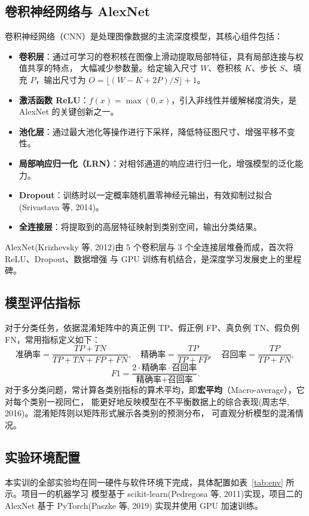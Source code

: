 \documentclass[12pt,a4paper,fontset=fandol]{ctexart}   %
\numberwithin{figure}{section}
\numberwithin{table}{section}
\numberwithin{equation}{section}
\begin{document}
\subsection{卷积神经网络与 AlexNet}
卷积神经网络（CNN）是处理图像数据的主流深度模型，其核心组件包括：
\begin{itemize}[leftmargin=2.2em]
  \item \textbf{卷积层}：通过可学习的卷积核在图像上滑动提取局部特征，具有局部连接与权值共享的特点，
  大幅减少参数量。给定输入尺寸 $W$、卷积核 $K$、步长 $S$、填充 $P$，输出尺寸为
  $O=\lfloor (W-K+2P)/S\rfloor+1$。
  \item \textbf{激活函数 ReLU}：$f(x)=\max(0,x)$，引入非线性并缓解梯度消失，是 AlexNet 的关键创新之一。
  \item \textbf{池化层}：通过最大池化等操作进行下采样，降低特征图尺寸、增强平移不变性。
  \item \textbf{局部响应归一化（LRN）}：对相邻通道的响应进行归一化，增强模型的泛化能力。
  \item \textbf{Dropout}：训练时以一定概率随机置零神经元输出，有效抑制过拟合(Srivastava 等, 2014)。
  \item \textbf{全连接层}：将提取到的高层特征映射到类别空间，输出分类结果。
\end{itemize}
AlexNet(Krizhevsky 等, 2012)由 5 个卷积层与 3 个全连接层堆叠而成，首次将 ReLU、Dropout、数据增强
与 GPU 训练有机结合，是深度学习发展史上的里程碑。

\subsection{模型评估指标}
对于分类任务，依据混淆矩阵中的真正例 TP、假正例 FP、真负例 TN、假负例 FN，常用指标定义如下：
\begin{equation}
\text{准确率}=\frac{TP+TN}{TP+TN+FP+FN},\quad
\text{精确率}=\frac{TP}{TP+FP},\quad
\text{召回率}=\frac{TP}{TP+FN},
\end{equation}
\begin{equation}
F1=\frac{2\cdot\text{精确率}\cdot\text{召回率}}{\text{精确率}+\text{召回率}}.
\end{equation}
对于多分类问题，常计算各类别指标的算术平均，即\textbf{宏平均}（Macro-average），它对每个类别一视同仁，
能更好地反映模型在不平衡数据上的综合表现(周志华, 2016)。混淆矩阵则以矩阵形式展示各类别的预测分布，
可直观分析模型的混淆情况。

\subsection{实验环境配置}
本实训的全部实验均在同一硬件与软件环境下完成，具体配置如表~\ref{tab:env} 所示。项目一的机器学习
模型基于 scikit-learn(Pedregosa 等, 2011)实现，项目二的 AlexNet 基于 PyTorch(Paszke 等, 2019)
实现并使用 GPU 加速训练。
\end{document}
